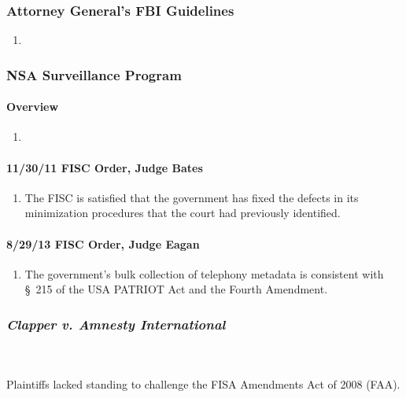 \subsubsection{Attorney General's FBI Guidelines}

\begin{enumerate}
    \item %
\end{enumerate}

\subsubsection{NSA Surveillance Program}

\paragraph{Overview} %

\begin{enumerate}
    \item
\end{enumerate}

\paragraph{11/30/11 FISC Order, Judge Bates}

\begin{enumerate}
    \item The FISC is satisfied that the government has fixed the defects in 
    its minimization procedures that the court had previously identified.
\end{enumerate}

\paragraph{8/29/13 FISC Order, Judge Eagan}

\begin{enumerate}
    \item The government's bulk collection of telephony metadata is consistent 
    with \S\ 215 of the USA PATRIOT Act and the Fourth Amendment.
\end{enumerate}

\subsubsection{\emph{Clapper v. Amnesty International}}
~\\\\
Plaintiffs lacked standing to challenge the FISA Amendments Act of 2008 (FAA).

